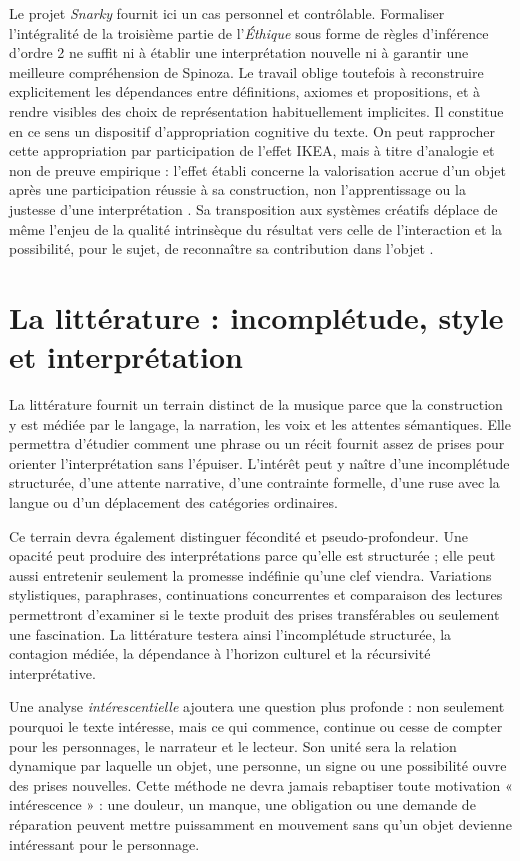 \documentclass[11pt,a4paper]{article}
\begin{document}
Le projet \emph{Snarky} fournit ici un cas personnel et contrôlable. Formaliser
l'intégralité de la troisième partie de l'\emph{Éthique} sous forme de règles
d'inférence d'ordre 2 ne suffit ni à établir une interprétation nouvelle ni à
garantir une meilleure compréhension de Spinoza. Le travail oblige toutefois à
reconstruire explicitement les dépendances entre définitions, axiomes et
propositions, et à rendre visibles des choix de représentation habituellement
implicites. Il constitue en ce sens un dispositif d'appropriation cognitive du
texte. On peut rapprocher cette appropriation par participation de l'effet IKEA,
mais à titre d'analogie et non de preuve empirique : l'effet établi concerne la
valorisation accrue d'un objet après une participation réussie à sa construction,
non l'apprentissage ou la justesse d'une interprétation
\parencite{norton2012ikea}. Sa transposition aux systèmes créatifs déplace de
même l'enjeu de la qualité intrinsèque du résultat vers celle de l'interaction et
la possibilité, pour le sujet, de reconnaître sa contribution dans l'objet
\parencite[152--153]{pachet2026generation}.

\section{La littérature : incomplétude, style et interprétation}

La littérature fournit un terrain distinct de la musique parce que la
construction y est médiée par le langage, la narration, les voix et les attentes
sémantiques. Elle permettra d'étudier comment une phrase ou un récit fournit
assez de prises pour orienter l'interprétation sans l'épuiser. L'intérêt peut y
naître d'une incomplétude structurée, d'une attente narrative, d'une contrainte
formelle, d'une ruse avec la langue ou d'un déplacement des catégories
ordinaires.

Ce terrain devra également distinguer fécondité et pseudo-profondeur. Une
opacité peut produire des interprétations parce qu'elle est structurée ; elle
peut aussi entretenir seulement la promesse indéfinie qu'une clef viendra.
Variations stylistiques, paraphrases, continuations concurrentes et comparaison
des lectures permettront d'examiner si le texte produit des prises
transférables ou seulement une fascination. La littérature testera ainsi
l'incomplétude structurée, la contagion médiée, la dépendance à l'horizon
culturel et la récursivité interprétative.

Une analyse \emph{intérescentielle} ajoutera une question plus profonde : non
seulement pourquoi le texte intéresse, mais ce qui commence, continue ou cesse
de compter pour les personnages, le narrateur et le lecteur. Son unité sera la
relation dynamique par laquelle un objet, une personne, un signe ou une
possibilité ouvre des prises nouvelles. Cette méthode ne devra jamais rebaptiser
toute motivation « intérescence » : une douleur, un manque, une obligation ou
une demande de réparation peuvent mettre puissamment en mouvement sans qu'un
objet devienne intéressant pour le personnage.
\end{document}
